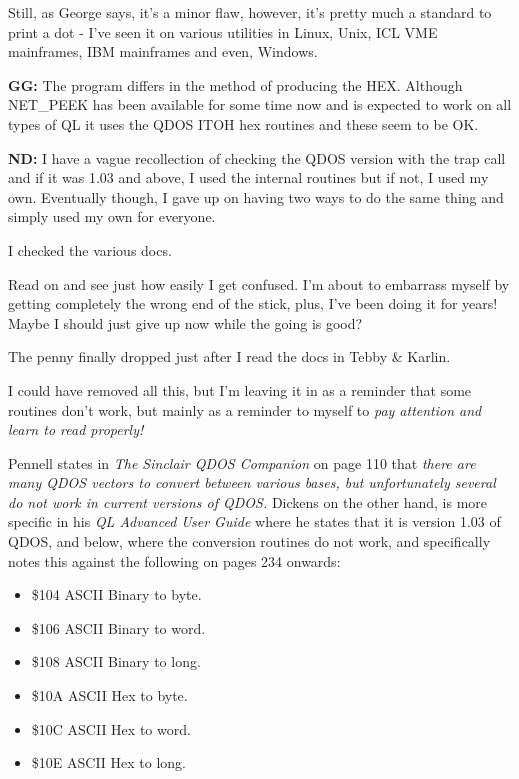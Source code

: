Still, as George says, it's a minor flaw, however, it's pretty much a standard to print a dot - I've seen it on various utilities in Linux, Unix, ICL VME mainframes, IBM mainframes and even, Windows.

\textbf{GG: }The program differs in the method of producing the HEX. Although NET\_PEEK has been available for some time now and is expected to work on all types of QL it uses the QDOS ITOH hex routines and these seem to be OK.

\textbf{ND: }I have a vague recollection of checking the QDOS version with the  trap call and if it was 1.03 and above, I used the internal routines but if not, I used my own. Eventually though, I gave up on having two ways to do the same thing and simply used my own for everyone.

I checked the various docs. 

\begin{note}
Read on and see just how easily I get confused. I'm about to embarrass myself by getting completely the wrong end of the stick, plus, I've been doing it for years! Maybe I should just give up now while the going is good?

The penny finally dropped just after I read the docs in Tebby \& Karlin.

I could have removed all this, but I'm leaving it in as a reminder that some routines don't work, but mainly as a reminder to myself to \emph{pay attention and learn to read properly!}
\end{note}

Pennell states in \emph{The Sinclair QDOS Companion} on page 110 that \emph{there are many QDOS vectors to convert between various bases, but unfortunately several do not work in current versions of QDOS.} Dickens on the other hand, is more specific in his \emph{QL Advanced User Guide} where he states that it is version 1.03 of QDOS, and below, where the conversion routines do not work, and specifically notes this against the following on pages 234 onwards:

\begin{itemize}
\item {} \$104 ASCII Binary to byte.
\item {} \$106 ASCII Binary to word.
\item {} \$108 ASCII Binary to long.
\item {} \$10A ASCII Hex to byte.
\item {} \$10C ASCII Hex to word.
\item {} \$10E ASCII Hex to long.
\end{itemize}

